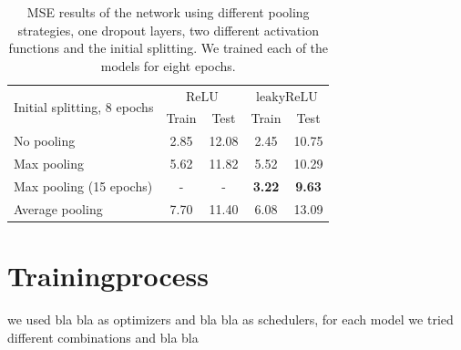 \documentclass[conference]{IEEEtran}
\begin{document}
\begin{table}[!t]
\normalsize
\centering
\begin{tabular}{lcccc}
\toprule
\multirow{2}{*}{Initial splitting, 8 epochs}  & \multicolumn{2}{c}{$\mathrm{ReLU}$} & \multicolumn{2}{c}{$\mathrm{leakyReLU}$} \\
 & Train & Test & Train & Test\\
\midrule
No pooling & 2.85 & 12.08 & 2.45 & 10.75 \\
Max pooling & 5.62 & 11.82 & 5.52 & 10.29 \\
Max pooling (15 epochs) & - & - & \textbf{3.22} & \textbf{9.63} \\
Average pooling & 7.70 & 11.40 & 6.08 & 13.09\\
\bottomrule
\end{tabular}
\caption{MSE results of the network using different pooling strategies, one dropout layers, two different activation functions and 
the initial splitting. We trained each of the models for eight epochs.}
\label{tab:ResultsInitialSplitting}
\end{table}

\section{Trainingprocess}
we used bla bla as optimizers and bla bla as schedulers, for each model we tried different combinations and bla bla

\end{document}
